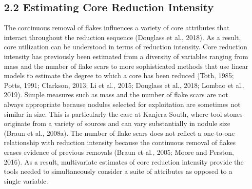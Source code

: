 \documentclass[]{elsarticle} %
\begin{document}
\hypertarget{estimating-core-reduction-intensity}{%
\subsection{2.2 Estimating Core Reduction
Intensity}\label{estimating-core-reduction-intensity}}

The continuous removal of flakes influences a variety of core attributes
that interact throughout the reduction sequence (\hspace{0pt}Douglass et
al., 2018\hspace{0pt}). As a result, core utilization can be understood
in terms of reduction intensity. Core reduction intensity has previously
been estimated from a diversity of variables ranging from mass and the
number of flake scars to more sophisticated methods that use linear
models to estimate the degree to which a core has been reduced
(\hspace{0pt}Toth, 1985\hspace{0pt}; \hspace{0pt}Potts,
1991\hspace{0pt}; \hspace{0pt}Clarkson, 2013\hspace{0pt}; \hspace{0pt}Li
et al., 2015\hspace{0pt}; \hspace{0pt}Douglass et al., 2018\hspace{0pt};
\hspace{0pt}Lombao et al., 2019\hspace{0pt}). Simple measures such as
mass and the number of flake scars are not always appropriate because
nodules selected for exploitation are sometimes not similar in size.
This is particularly the case at Kanjera South, where tool stones
originate from a variety of sources and can vary substantially in nodule
size (\hspace{0pt}Braun et al., 2008a\hspace{0pt}). The number of flake
scars does not reflect a one-to-one relationship with reduction
intensity because the continuous removal of flakes erases evidence of
previous removals (\hspace{0pt}Braun et al., 2005\hspace{0pt};
\hspace{0pt}Moore and Perston, 2016\hspace{0pt}). As a result,
multivariate estimates of core reduction intensity provide the tools
needed to simultaneously consider a suite of attributes as opposed to a
single variable.
\end{document}
